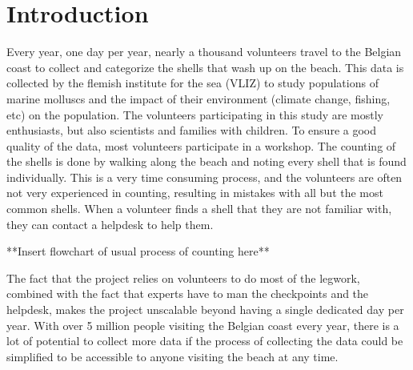 
\chapter{Introduction}

Every year, one day per year, nearly a thousand volunteers travel to the Belgian coast to collect and categorize the shells that wash up on the beach. This data is collected by the flemish institute for the sea (VLIZ) to study populations of marine molluscs and the impact of their environment (climate change, fishing, etc) on the population. The volunteers participating in this study are mostly enthusiasts, but also scientists and families with children. To ensure a good quality of the data, most volunteers participate in a workshop. The counting of the shells is done by walking along the beach and noting every shell that is found individually. This is a very time consuming process, and the volunteers are often not very experienced in counting, resulting in mistakes with all but the most common shells. When a volunteer finds a shell that they are not familiar with, they can contact a helpdesk to help them.

**Insert flowchart of usual process of counting here**

The fact that the project relies on volunteers to do most of the legwork, combined with the fact that experts have to man the checkpoints and the helpdesk, makes the project unscalable beyond having a single dedicated day per year. With over 5 million people
visiting the Belgian coast every year, there is a lot of potential to collect more data if the process of collecting the data could be simplified to be accessible to anyone visiting the beach at any time.

